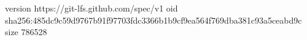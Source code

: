 version https://git-lfs.github.com/spec/v1
oid sha256:485dc9c59d9767b91f97703fdc3366b1b9cf9ea564f769dba381c93a5ceabd9c
size 786528

